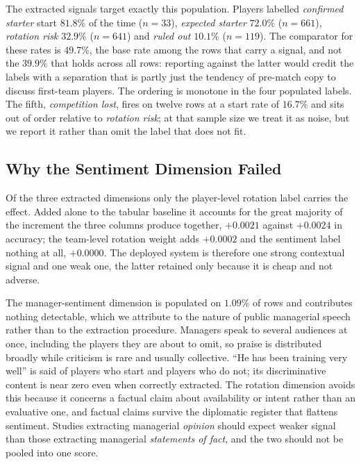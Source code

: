 \documentclass[conference]{IEEEtran}
\begin{document}
The extracted signals target exactly this population. Players labelled \emph{confirmed starter} start $81.8\%$ of the time ($n = 33$), \emph{expected starter} $72.0\%$ ($n = 661$), \emph{rotation risk} $32.9\%$ ($n = 641$) and \emph{ruled out} $10.1\%$ ($n = 119$). The comparator for these rates is $49.7\%$, the base rate among the rows that carry a signal, and not the $39.9\%$ that holds across all rows: reporting against the latter would credit the labels with a separation that is partly just the tendency of pre-match copy to discuss first-team players. The ordering is monotone in the four populated labels. The fifth, \emph{competition lost}, fires on twelve rows at a start rate of $16.7\%$ and sits out of order relative to \emph{rotation risk}; at that sample size we treat it as noise, but we report it rather than omit the label that does not fit.

\subsection{Why the Sentiment Dimension Failed}

Of the three extracted dimensions only the player-level rotation label carries the effect. Added alone to the tabular baseline it accounts for the great majority of the increment the three columns produce together, $+0.0021$ against $+0.0024$ in accuracy; the team-level rotation weight adds $+0.0002$ and the sentiment label nothing at all, $+0.0000$. The deployed system is therefore one strong contextual signal and one weak one, the latter retained only because it is cheap and not adverse.

The manager-sentiment dimension is populated on $1.09\%$ of rows and contributes nothing detectable, which we attribute to the nature of public managerial speech rather than to the extraction procedure. Managers speak to several audiences at once, including the players they are about to omit, so praise is distributed broadly while criticism is rare and usually collective. ``He has been training very well'' is said of players who start and players who do not; its discriminative content is near zero even when correctly extracted. The rotation dimension avoids this because it concerns a factual claim about availability or intent rather than an evaluative one, and factual claims survive the diplomatic register that flattens sentiment. Studies extracting managerial \emph{opinion} should expect weaker signal than those extracting managerial \emph{statements of fact}, and the two should not be pooled into one score.
\end{document}
